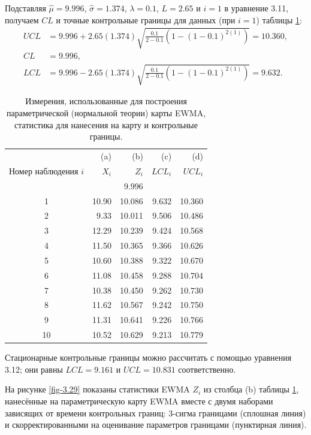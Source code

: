 Подставляя \(\hat{\mu} = 9.996\), \(\hat{\sigma} = 1.374\), \(\lambda = 0.1\), \(L = 2.65\) и \(i = 1\) в уравнение 3.11, получаем \(CL\) и точные контрольные границы для данных (при \(i = 1\)) таблицы \ref{tab:3.22}:
\[
\begin{aligned}
	UCL &= 9.996 + 2.65(1.374)\sqrt{\frac{0.1}{2 - 0.1}\left(1 - (1 - 0.1)^{2(1)}\right)} = 10.360, \\
	CL &= 9.996, \\
	LCL &= 9.996 - 2.65(1.374)\sqrt{\frac{0.1}{2 - 0.1}\left(1 - (1 - 0.1)^{2(1)}\right)} = 9.632.
\end{aligned}
\]

\begin{table}[htbp]
	\centering
	\caption{Измерения, использованные для построения параметрической (нормальной теории) карты EWMA, статистика для нанесения на карту и контрольные границы.}
	\label{tab:3.22}
	\begin{tabular}{crrrr}
		\toprule
		& (a) & (b) & (c) & (d) \\
		Номер наблюдения \(i\) & \(X_i\) & \(Z_i\) & \(LCL_i\) & \(UCL_i\) \\
		\midrule
		&      & 9.996 &       &       \\
		1  & 10.90 & 10.086 & 9.632 & 10.360 \\
		2  & 9.33  & 10.011 & 9.506 & 10.486 \\
		3  & 12.29 & 10.239 & 9.424 & 10.568 \\
		4  & 11.50 & 10.365 & 9.366 & 10.626 \\
		5  & 10.60 & 10.388 & 9.322 & 10.670 \\
		6  & 11.08 & 10.458 & 9.288 & 10.704 \\
		7  & 10.38 & 10.450 & 9.262 & 10.730 \\
		8  & 11.62 & 10.567 & 9.242 & 10.750 \\
		9  & 11.31 & 10.641 & 9.226 & 10.766 \\
		10 & 10.52 & 10.629 & 9.213 & 10.779 \\
		\bottomrule
	\end{tabular}
\end{table}

Стационарные контрольные границы можно рассчитать с помощью уравнения 3.12; они равны \(LCL = 9.161\) и \(UCL = 10.831\) соответственно.

На рисунке \ref{fig-3.29} показаны статистики EWMA \(Z_i\) из столбца (b) таблицы \ref{tab:3.22}, нанесённые на параметрическую карту EWMA вместе с двумя наборами зависящих от времени контрольных границ: 3-сигма границами (сплошная линия) и скорректированными на оценивание параметров границами (пунктирная линия).

